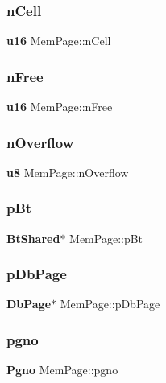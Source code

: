 \mbox{\label{struct_mem_page_a35d1d8f836201b82b1eb778ce0e324f4}} 
\subsubsection{nCell}
{\footnotesize\ttfamily \textbf{ u16} Mem\+Page\+::n\+Cell}

\mbox{\label{struct_mem_page_a3418a9aee707f57a73d8470f8a1228a8}} 
\subsubsection{nFree}
{\footnotesize\ttfamily \textbf{ u16} Mem\+Page\+::n\+Free}

\mbox{\label{struct_mem_page_a3f7fa1a1eba3af840ef887e8ddd6d2cc}} 
\subsubsection{nOverflow}
{\footnotesize\ttfamily \textbf{ u8} Mem\+Page\+::n\+Overflow}

\mbox{\label{struct_mem_page_a949df1156f7392592eaeb64389068f99}} 
\subsubsection{pBt}
{\footnotesize\ttfamily \textbf{ Bt\+Shared}$\ast$ Mem\+Page\+::p\+Bt}

\mbox{\label{struct_mem_page_add322c1aed91e95d8dfe3ac3535d65b4}} 
\subsubsection{pDbPage}
{\footnotesize\ttfamily \textbf{ Db\+Page}$\ast$ Mem\+Page\+::p\+Db\+Page}

\mbox{\label{struct_mem_page_ad2b0c532abc799bbcf3b43df4f0b0546}} 
\subsubsection{pgno}
{\footnotesize\ttfamily \textbf{ Pgno} Mem\+Page\+::pgno}

